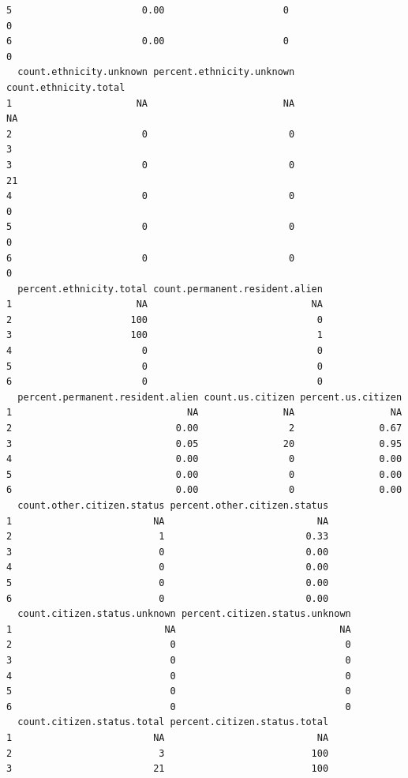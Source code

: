 \documentclass[
  letterpaper,
  DIV=11,
  numbers=noendperiod]{scrartcl}
\begin{document}
\begin{verbatim}
5                       0.00                     0                       0
6                       0.00                     0                       0
  count.ethnicity.unknown percent.ethnicity.unknown count.ethnicity.total
1                      NA                        NA                    NA
2                       0                         0                     3
3                       0                         0                    21
4                       0                         0                     0
5                       0                         0                     0
6                       0                         0                     0
  percent.ethnicity.total count.permanent.resident.alien
1                      NA                             NA
2                     100                              0
3                     100                              1
4                       0                              0
5                       0                              0
6                       0                              0
  percent.permanent.resident.alien count.us.citizen percent.us.citizen
1                               NA               NA                 NA
2                             0.00                2               0.67
3                             0.05               20               0.95
4                             0.00                0               0.00
5                             0.00                0               0.00
6                             0.00                0               0.00
  count.other.citizen.status percent.other.citizen.status
1                         NA                           NA
2                          1                         0.33
3                          0                         0.00
4                          0                         0.00
5                          0                         0.00
6                          0                         0.00
  count.citizen.status.unknown percent.citizen.status.unknown
1                           NA                             NA
2                            0                              0
3                            0                              0
4                            0                              0
5                            0                              0
6                            0                              0
  count.citizen.status.total percent.citizen.status.total
1                         NA                           NA
2                          3                          100
3                         21                          100

\end{verbatim}
\end{document}
